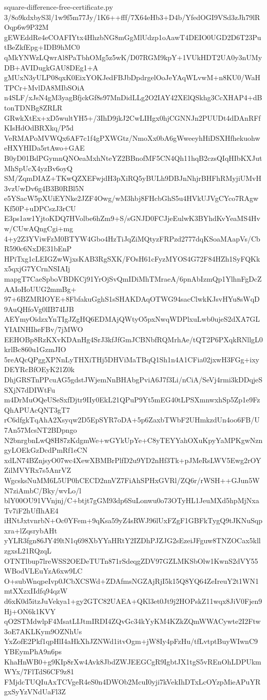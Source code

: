 \documentclass[11pt]{article}
\theoremstyle{definition}
\theoremstyle{remark}
\begin{document}
\begin{filecontents*}[overwrite]{square-difference-free-certificate.py}
3/8o9kdxbyS3l/1w9f5m77Jy/1K6++fff/7X64eHb3+D4b/YfedOGI9VSd3zJh79lROqp6w9P32M
gEWEddRe4eCOAFIYtx4HhzbNG8mGgMlUdzp1oAawT4DEIO0UGD2D6T23PutBeZkfEpg+IDB9hMC0
qMkYNWzLQwrAl8PaTbhOMg5z5wK/D07RGM9kpY+1VUkHDT2UA0y3nUMyDB+AVIDugkGAU8DEg1+A
gMUxN3yULP08qxK0EixYOKJedFBJbDpdrgelOoJeYAqWLvwM+n8KU0/WaHTPCr+MvlDA8MIbSOiA
n4SLF/xJsN4gM3yagBfjckGf8s97MnDidLLg2O2IAY42XElQSkhg3CcXHAP4+dBtonTDNBg8ZRLR
GRwkXtEx+xD5wultYH5+/3IhD9jkJ2CwLIHgx0hjCGNNJn2PUUDt4dDAnRFfKIsHdOdBRXkq/P5d
VeRMAPoMVWQx6AF7c1f4gPXWGtz/NmoXx0bA6gWweeyhHiDSXHfhekuohweHXYHIDa5rtAwo+GAE
B0yD01BdPGymnQNOeaMxhNteYZ2BBnofMF5CN4Qh11hqB2czsQIqHIbKXJutMhSpUcX4yzBv6oyQ
SM/ZqmDIAZ+TKwQZXEFwjdH3pXiRQ5yBULh9DBJnNhjrBHFhRMyjiUMvH3vzUwDv6g4B3B0RBl5N
e5YSacW5pXUiEYNke2JZF4Owg/wM3hbj8FHcbGhS5u4HVkUJVgCYco7RAgwKf50P+uDPCszJ3rCU
E3ps1aw1YjtoKDQ7HVolbe6hZm9+S/sGNJD0FCJjeEulwK3BYhdKvYeaMS4Hvw/CUwAQngCgi+mg
4+y2Z3YViwFzM0BTYW4Gbo4HzTiJqZiMQtyzFRPzd2777dqKSoaMAapVs/CbR590c6NxDE31bEnP
HPiTxg1cLEIGZwWjxsKAB3RgSXK/FOsH61cFyzMYOS4G72F84HZh1SyFQKkx5qxjG7YCrnNSIAIj
mapgT7CaeSpboVBDKCj91YrOjSvQmIDiMhTMraeA/6pnAbIzmQp1YlhnFgDcZAAIoHoUUG2mmBg+
97+6BZMRIOYE+8FbfakuGghS1sSHAKDAqOTWG94sacClwkKJsvHYu8sWqD9AuQHfoVg0lIB74IJB
AEYmyOidzxYnTIgJZgHQ6EDMAjQWtyO5pxNwqWDPlxuLwb0ujeS2dXA7GLYIAINHIheFBv/7jMWO
EEHOBp8RzKXvKDAnHg4SrJ3kfJfGmJCBNbfRQMrhAe/tQT2P6PXqkRNllgL0krlBc860u1GzmJIO
5reAQcQPggXPNnLyTHXiTHj5DHViMaTBqQ1Sh1n4A1CFia02jxwH3FGg+ixyDEYRcBfOEyK21Z0k
DhjGRSTnPPcuAG5gdstJWjemNnBHAbgPviA6J7f3Li/nCiA/SeVj4rmi3kDDqjeSSXjN7dDIWtFu
m4DrMuOQeUSeSxfDjtr9IIy0EkL21QPuP9Yt5mEG40tLPSXmnwxhSp5Zp1e9FzQhAPUAcQNT3gT7
rC6dfgkTqAhA2Xsyqw2D5EpSYR7oDA+5p6ZaxbTWbF2UHmkzdUn4oo6FB/U7An57McsNT2BDpngo
N2bnrgbnLwQ8H87zKdgmWe+wGYkUpYe+C8yTEYYahOXuKpyYaMPKgwNzngyLOEkGzDcdPmRf1eCN
xdLN74BZnjsyO07wc4XewXBMBrPlfD2u9YD2nHf3Tk+pJMeRsLWV5Ewg2rOYZilMVYRx7s5AnrVZ
WgcsksNuMM6L5UP0hCECD2nnVZ7FiAhSPHxGVRl/ZQ6r/rWSH++GJun5WN7ziAmbC/Bky/wvLo/l
blY00OU91VVnjnj/C+btjt7gGM93dp6SuLonwu0o73OTyHL1JeuMXd5hpMjNxaTv7iF2hUfIhAE4
iHNtJxtvnrbN+Oc0YFem+9qKsa59yZ4sRWJ96lUxFZgF1GBFkTygQ9tJKNuSqpxra+lZqsrybAHt
yYLR3fgn86JY49ltN1q698XbYYaHRtY2IZDhPJZJG2sEzeiJFguw8TNZOCax5kllzgxsL21RQzqL
OTNTlbup7lreWSS2OEDeTUTn871rSdeqgZDV97GZLMKSbOlw1KwnS2dVY55WBodVLEuYzA6xw9LC
O+subWnqpeIvp0JCbXCSWd+ZDAfmsNGZAjRjI5k15Q8YQ64ZeIreuY2t1WN1mtXXzxIIdfq94qzW
d6xK0d5itzJuVekya1+gy2GTC82UAEA+QKl3et0Jt9j2HOPskZ11wqx8JiV0Fjen9Hj+ON6k1KVY
qO2STMdwlpF4MsatLIJtmIRDI4ZQvGc34kYyKM4KZkZQmWWACywte2I2Ftw3oE7AKLKym9OZNhUs
YxZofE2Pkf1qpHlI4aHkXhJZNWd1itvOgm+jW8Iy4pFzHu/tfLvtptBuyWIwnC9YBEymPhA9n6ps
KhaHnWB0+g9KIp8rXw4Avk8JbdZWJEEGCgR9IgbtJX1tgS5vREnOhLDPUkmWYx/7FlTdS6CF9z81
FMjdcTUQIuAxTCVgeR4eS0n4DWOb2McuI0yji7kVekIhDTxLcOYzpMieAPuYRgxSyYzVNdUaFl3Z

\end{filecontents*}
\end{document}
